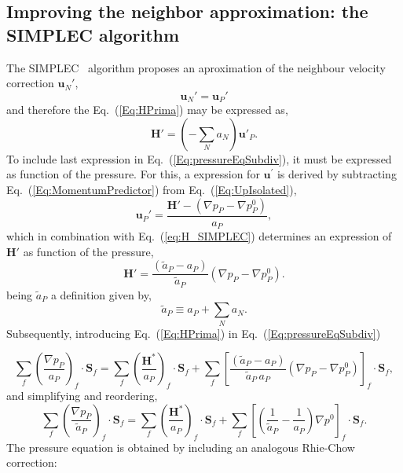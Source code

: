 \documentclass[final,3p,times,11pt,onecolumn]{myElsarticle}
\numberwithin{equation}{section}
\begin{document}
\subsection{Improving the neighbor approximation: the SIMPLEC algorithm}
The SIMPLEC~\cite{vanDoormal} algorithm proposes an aproximation of the neighbour velocity correction $\boldsymbol{u}_N'$,
\begin{equation}
\label{Eq:simplecAproximation}
\boldsymbol{u}_N'
=
\boldsymbol{u}_P'
\end{equation}
and therefore the Eq.~(\ref{Eq:HPrima}) may be expressed as,
\begin{equation}
\label{eq:H_SIMPLEC}
\boldsymbol{H}'= \left(-\sum_N a_N\right) \boldsymbol{u}'_P.
\end{equation}
To include last expression in Eq.~(\ref{Eq:pressureEqSubdiv}), it must be expressed as function of the  pressure. For this, a expression for $\boldsymbol{u}^{'}$ is derived by subtracting Eq.~(\ref{Eq:MomentumPredictor}) from Eq.~(\ref{Eq:UpIsolated}),
\begin{equation}
\label{Eq:UPrimaIsolated}
\boldsymbol{u}_P'
=
\dfrac
{
\boldsymbol{H}'
- 
\left(
\nabla p_P
-
\nabla p_P^{0}
\right)
}
{a_P},
\end{equation}
which in combination with Eq.~(\ref{eq:H_SIMPLEC}) determines an expression of $\boldsymbol{H}'$ as function of the pressure,
\begin{equation}
\label{Eq:HPrima}
\boldsymbol{H}'
= 
\dfrac
{
\left(
\tilde{a}_P
-
a_P
\right)
}
{
\tilde{a}_P
}
\left(
\nabla p_P
-
\nabla p_P^{0}
\right).
\end{equation}
being $\tilde{a}_P$ a definition given by,
\begin{equation}
\tilde{a}_P
\equiv
a_P + \sum_{N} a_{N}.
\end{equation}
Subsequently, introducing Eq.~(\ref{Eq:HPrima}) in Eq.~(\ref{Eq:pressureEqSubdiv})

\begin{equation}
\label{Eq:pressureReplacedSimplec}
\sum_{f} 
\left(
\dfrac
{
\nabla p_P}
{a_P}
\right)_f
\cdotp 
\boldsymbol{S}_{f}
=
\sum_{f} 
\left(
\dfrac
{
\boldsymbol{H}^{*}
}
{a_P}
\right)_f
\cdotp 
\boldsymbol{S}_{f}
+
\sum_f
\left[
\dfrac
{
\left(
\tilde{a}_P
-
a_P
\right)
}
{
\tilde{a}_P\,a_P
}
\left(
\nabla p_P
-
\nabla p_P^{0}
\right)
\right]_f
\cdot
\boldsymbol{S}_{f},
\end{equation}
and simplifying and reordering,
\begin{equation}
\label{Eq:pressureReplacedSimplec2}
\sum_{f} 
\left(
\dfrac
{
\nabla p_P}
{\tilde{a}_P}
\right)_f
\cdotp 
\boldsymbol{S}_{f}
=
\sum_{f} 
\left(
\dfrac
{
\boldsymbol{H}^{*}
}
{a_P}
\right)_f
\cdotp 
\boldsymbol{S}_{f}
+
\sum_f
\left[
\left(
\dfrac{1}
{\tilde{a}_P}
-
\dfrac{1}
{a_P}
\right)
\nabla p^{0}
\right]_f
\cdot
\boldsymbol{S}_f.
\end{equation}
The pressure equation is obtained by including an analogous Rhie-Chow correction:
\end{document}
